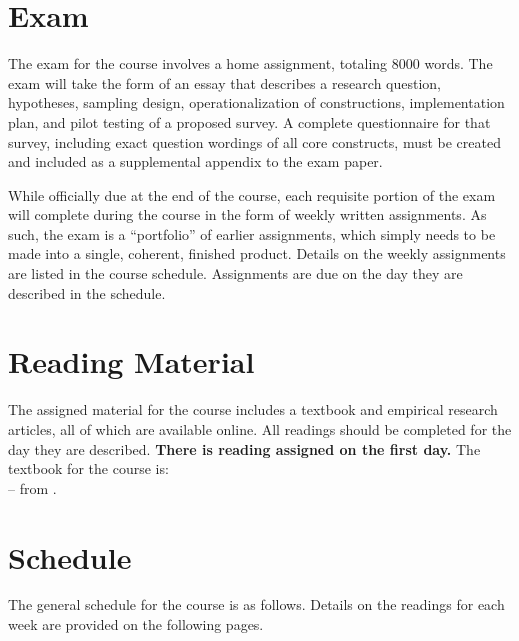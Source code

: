 \documentclass[12pt,a4paper]{article}
\newcommand{\reading}[2][]{\noindent --{#1} from \bibentry{#2}.\vspace{.25em}\\}
\begin{document}
\section{Exam}
The exam for the course involves a home assignment, totaling 8000 words. The exam will take the form of an essay that describes a research question, hypotheses, sampling design, operationalization of constructions, implementation plan, and pilot testing of a proposed survey. A complete questionnaire for that survey, including exact question wordings of all core constructs, must be created and included as a supplemental appendix to the exam paper.

While officially due at the end of the course, each requisite portion of the exam will complete during the course in the form of weekly written assignments. As such, the exam is a ``portfolio'' of earlier assignments, which simply needs to be made into a single, coherent, finished product. Details on the weekly assignments are listed in the course schedule. Assignments are due on the day they are described in the schedule.



\section{Reading Material}
The assigned material for the course includes a textbook and empirical research articles, all of which are available online. All readings should be completed for the day they are described. \textbf{There is reading assigned on the first day.} The textbook for the course is:\\

\reading{Grovesetal2004}

\clearpage
\section{Schedule}
The general schedule for the course is as follows. Details on the readings for each week are provided on the following pages.

\secttoc

\clearpage


\end{document}
